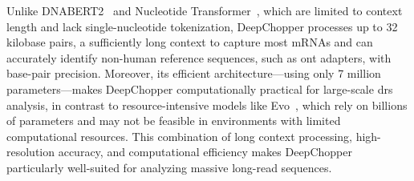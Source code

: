 \documentclass[pdflatex,sn-nature, lineno]{sn-jnl}%
\begin{document}
Unlike DNABERT2~\cite{zhou2023dnabert2} and Nucleotide Transformer~\cite{dalla2023nucleotide}, which are limited to context length and lack single-nucleotide tokenization, DeepChopper processes up to 32 kilobase pairs, a sufficiently long context to capture most mRNAs and can accurately identify non-human reference sequences, such as \gls{ont} adapters, with base-pair precision.
Moreover, its efficient architecture—using only 7 million parameters—makes DeepChopper computationally practical for large-scale \gls{drs} analysis, in contrast to resource-intensive models like Evo~\cite{nguyen2024sequence}, which rely on billions of parameters and may not be feasible in environments with limited computational resources.
This combination of long context processing, high-resolution accuracy, and computational efficiency makes DeepChopper particularly well-suited for analyzing massive long-read sequences.
\end{document}
